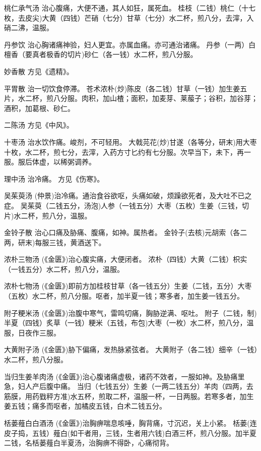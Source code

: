 \documentclass[a4paper,12pt,UTF8,twoside]{ctexbook}
\begin{document}
    桃仁承气汤
    治心腹痛，大便不通，其人如狂，属死血。
    桂枝（二钱）桃仁（十七枚，去皮尖)大黄（四钱）芒硝（七分）甘草（七分）水二杯，煎八分，去滓，入硝二沸，温服。
    
    丹参饮
    治心胸诸痛神验，妇人更宜。亦属血痛。亦可通治诸痛。
    丹参（一两）白檀香（要真者极香的切片)砂仁（各一钱）水二杯，煎八分服。
    
    妙香散
    方见《遗精》。
    
    平胃散
    治一切饮食停滞。
    苍术浓朴(炒)陈皮（各二钱）甘草（一钱）加生姜五片，水二杯，煎八分服。肉积，加山楂；面积，加麦芽、莱菔子；谷积，加谷芽；酒积，加葛根、砂仁。
    
    二陈汤
    方见《中风》。
    
    十枣汤
    治水饮作痛。峻剂，不可轻用。
    大戟芫花(炒)甘遂（各等分，研末)用大枣十枚，水二杯，煎七分，去滓，入药方寸匕约有七分服。次早当下，未下，再一服。服后体虚，以稀粥调养。
    
    理中汤
    治冷痛。
    方见《伤寒》。
    
    吴茱萸汤
    (仲景)治冷痛。通治食谷欲呕，头痛如破，烦躁欲死者，及大吐不已之症。
    吴茱萸（二钱五分，汤泡)人参（一钱五分）大枣（五枚）生姜（三钱，切片)水二杯，煎八分，温服。
    
    金铃子散
    治心口痛及胁痛、腹痛，如神。属热者。
    金铃子(去核)元胡索（各二两，研末)每服三钱，黄酒送下。
    
    浓朴三物汤
    (《金匮》)治心腹实痛，大便闭者。
    浓朴（四钱）大黄（二钱）枳实（一钱五分）水二杯，煎八分，温服。
    
    浓朴七物汤
    (《金匮》)即前方加桂枝甘草（各一钱五分）生姜（二钱，五分）大枣（五枚）水二杯，煎八分服。呕者，加半夏一钱；寒多者，加生姜一钱五分。
    
    附子粳米汤
    (《金匮》)治腹中寒气，雷鸣切痛，胸胁逆满、呕吐。
    附子（二钱，制)半夏（四钱）炙草（一钱）粳米（五钱，布包)大枣（一枚）水二杯，煎八分，温服，日夜作三服。
    
    大黄附子汤
    (《金匮》)胁下偏痛，发热脉紧弦者。
    大黄附子（各二钱）细辛（一钱）水二杯，煎八分服。
    
    当归生姜羊肉汤
    (《金匮》)治心腹诸痛虚极，诸药不效者，一服如神。及胁痛里急，妇人产后腹中痛。
    当归（七钱五分）生姜（一两二钱五分）羊肉（四两，去筋膜，用药戥秤方准)水五杯，煎取二杯，温服一杯，一日两服。若寒多者，加生姜五钱；痛多而呕者，加橘皮五钱，白术二钱五分。
    
    栝蒌薤白白酒汤
    (《金匮》)治胸痹喘息咳唾，胸背痛，寸沉迟，关上小紧。
    栝蒌(连皮子捣，五钱）薤白(如干者用，三钱，生者用六钱)白酒三杯，煎八分服。加半夏二钱，名栝蒌薤白半夏汤，治胸痹不得卧，心痛彻背。
    
\end{document}
